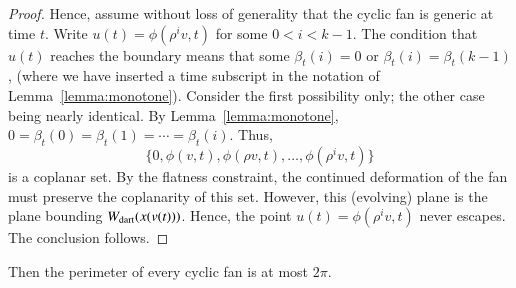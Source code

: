 \begin{proof}
Hence, assume without loss of generality that the cyclic fan is generic at time $t$. Write $u(t) = \phi(\rho^i v,t)$ for some $0< i < k-1$.  The condition that $u(t)$ reaches the boundary means that some $\beta_t(i)=0$ or $\beta_t(i)=\beta_t(k-1)$, (where we have inserted a time subscript in the notation of Lemma~\ref{lemma:monotone}).  Consider the first possibility only; the other case being nearly identical.  By Lemma~\ref{lemma:monotone}, $0=\beta_t(0)=\beta_t(1)=\cdots=\beta_t(i)$.  Thus,
$$\{0,\phi(v,t),\phi(\rho v,t),\ldots,\phi(\rho^i v,t)\}$$
is a coplanar set.  By the flatness constraint, the continued deformation of the fan must preserve the coplanarity of this set.  However, this (evolving) plane is the plane bounding $W_{\text{dart}}(x(v(t)))$.  Hence, the point $u(t) = \phi(\rho^iv ,t)$ never escapes. The conclusion follows.
\end{proof}






\begin{lemma}
Then the perimeter of every cyclic fan is at most $2\pi$.
\end{lemma}

